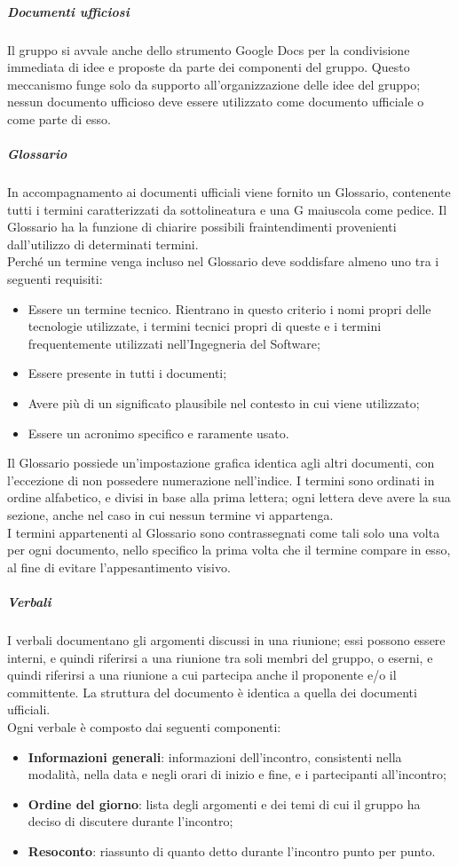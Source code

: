 \documentclass[../norme-di-progetto.tex]{subfiles}
\begin{document}
\subparagraph{Documenti ufficiosi}
Il gruppo si avvale anche dello strumento Google Docs per la condivisione immediata di idee e proposte da parte dei componenti del gruppo. Questo meccanismo funge solo da supporto all'organizzazione delle idee del gruppo; nessun documento ufficioso deve essere utilizzato come documento ufficiale o come parte di esso.

\subparagraph{Glossario}
In accompagnamento ai documenti ufficiali viene fornito un Glossario, contenente tutti i termini caratterizzati da sottolineatura e una G maiuscola come pedice. Il Glossario ha la funzione di chiarire possibili fraintendimenti provenienti dall'utilizzo di determinati termini. \\
Perché un termine venga incluso nel Glossario deve soddisfare almeno uno tra i seguenti requisiti:
\begin{itemize}
  \item Essere un termine tecnico. Rientrano in questo criterio i nomi propri delle tecnologie utilizzate, i termini tecnici propri di queste e i termini frequentemente utilizzati nell'Ingegneria del Software;
  \item Essere presente in tutti i documenti;
  \item Avere più di un significato plausibile nel contesto in cui viene utilizzato;
  \item Essere un acronimo specifico e raramente usato.
\end{itemize}
Il Glossario possiede un'impostazione grafica identica agli altri documenti, con l'eccezione di non possedere numerazione nell'indice. I termini sono ordinati in ordine alfabetico, e divisi in base alla prima lettera; ogni lettera deve avere la sua sezione, anche nel caso in cui nessun termine vi appartenga. \\
I termini appartenenti al Glossario sono contrassegnati come tali solo una volta per ogni documento, nello specifico la prima volta che il termine compare in esso, al fine di evitare l'appesantimento visivo.

\subparagraph{Verbali}
I verbali documentano gli argomenti discussi in una riunione; essi possono essere interni, e quindi riferirsi a una riunione tra soli membri del gruppo, o eserni, e quindi riferirsi a una riunione a cui partecipa anche il proponente e/o il committente. La struttura del documento è identica a quella dei documenti ufficiali. \\
Ogni verbale è composto dai seguenti componenti:
\begin{itemize}
  \item \textbf{Informazioni generali}: informazioni dell'incontro, consistenti nella modalità, nella data e negli orari di inizio e fine, e i partecipanti all'incontro;
  \item \textbf{Ordine del giorno}: lista degli argomenti e dei temi di cui il gruppo ha deciso di discutere durante l'incontro;
  \item \textbf{Resoconto}: riassunto di quanto detto durante l'incontro punto per punto.
\end{itemize}
\end{document}
